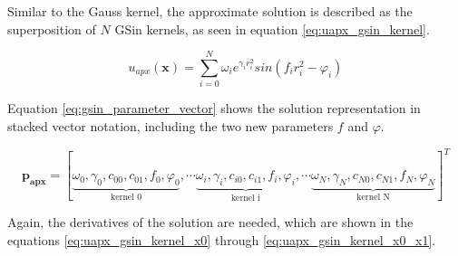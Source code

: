 \documentclass[./\jobname.tex]{subfiles}
\begin{document}
\begin{figure}[H]
	\centering
	\noindent{}
	\label{fig:gsin_kernel_3d_plot}
\end{figure}

Similar to the Gauss kernel, the approximate solution is described as the superposition of $N$ GSin kernels, as seen in equation \eqref{eq:uapx_gsin_kernel}. 

\begin{equation}
\label{eq:uapx_gsin_kernel}
u_{apx}(\mathbf{x}) = \sum_{i=0}^{N} \omega_i e^{\gamma_i r_i^2} sin(f_i r_i^2 - \varphi_i)
\end{equation}

Equation \eqref{eq:gsin_parameter_vector} shows the solution representation in stacked vector notation, including the two new parameters $f$ and $\varphi$. 

\begin{equation}
\label{eq:gsin_parameter_vector}
\mathbf{p_{apx}} = \left[\underbrace{\omega_0, \gamma_0, c_{00}, c_{01}, f_0, \varphi_0}_{\text{kernel 0}}, \cdots \underbrace{\omega_i, \gamma_i, c_{i0}, c_{i1}, f_i, \varphi_i}_{\text{kernel i}}, \cdots \underbrace{\omega_N, \gamma_N, c_{N0}, c_{N1}, f_N, \varphi_N}_{\text{kernel N}} \right]^T
\end{equation}

Again, the derivatives of the solution are needed, which are shown in the equations \eqref{eq:uapx_gsin_kernel_x0} through \eqref{eq:uapx_gsin_kernel_x0_x1}. 
\end{document}
